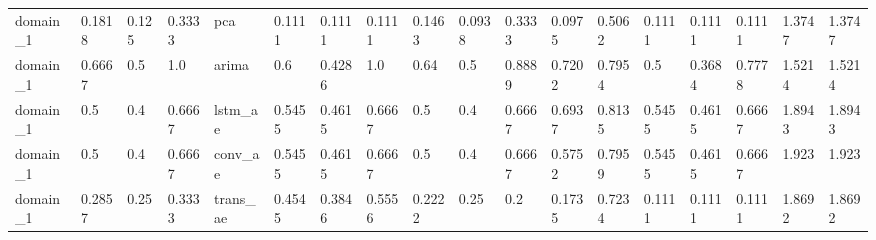 \begin{table}[h]
\begin{tabular}{llllllllllllllllll}
domain\_1 & 0.1818 & 0.125 & 0.3333 & pca & 0.1111 & 0.1111 & 0.1111 & 0.1463 & 0.0938 & 0.3333 & 0.0975 & 0.5062 & 0.1111 & 0.1111 & 0.1111 & 1.3747 & 1.3747 \\
domain\_1 & 0.6667 & 0.5 & 1.0 & arima & 0.6 & 0.4286 & 1.0 & 0.64 & 0.5 & 0.8889 & 0.7202 & 0.7954 & 0.5 & 0.3684 & 0.7778 & 1.5214 & 1.5214 \\
domain\_1 & 0.5 & 0.4 & 0.6667 & lstm\_ae & 0.5455 & 0.4615 & 0.6667 & 0.5 & 0.4 & 0.6667 & 0.6937 & 0.8135 & 0.5455 & 0.4615 & 0.6667 & 1.8943 & 1.8943 \\
domain\_1 & 0.5 & 0.4 & 0.6667 & conv\_ae & 0.5455 & 0.4615 & 0.6667 & 0.5 & 0.4 & 0.6667 & 0.5752 & 0.7959 & 0.5455 & 0.4615 & 0.6667 & 1.923 & 1.923 \\
domain\_1 & 0.2857 & 0.25 & 0.3333 & trans\_ae & 0.4545 & 0.3846 & 0.5556 & 0.2222 & 0.25 & 0.2 & 0.1735 & 0.7234 & 0.1111 & 0.1111 & 0.1111 & 1.8692 & 1.8692 \\
\bottomrule
\end{tabular}
\end{table}
